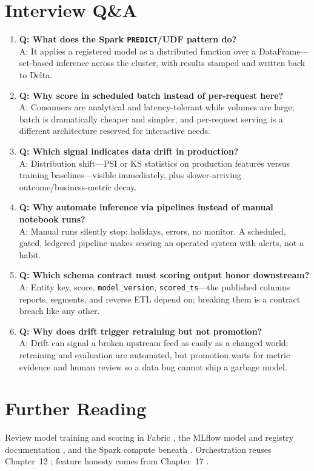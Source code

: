 \section{Interview Q\&A}
\begin{enumerate}
    \item \textbf{Q: What does the Spark \texttt{PREDICT}/UDF pattern do?}\\
    A: It applies a registered model as a distributed function over a DataFrame---set-based inference across the cluster, with results stamped and written back to Delta.
    \item \textbf{Q: Why score in scheduled batch instead of per-request here?}\\
    A: Consumers are analytical and latency-tolerant while volumes are large; batch is dramatically cheaper and simpler, and per-request serving is a different architecture reserved for interactive needs.
    \item \textbf{Q: Which signal indicates data drift in production?}\\
    A: Distribution shift---PSI or KS statistics on production features versus training baselines---visible immediately, plus slower-arriving outcome/business-metric decay.
    \item \textbf{Q: Why automate inference via pipelines instead of manual notebook runs?}\\
    A: Manual runs silently stop: holidays, errors, no monitor. A scheduled, gated, ledgered pipeline makes scoring an operated system with alerts, not a habit.
    \item \textbf{Q: Which schema contract must scoring output honor downstream?}\\
    A: Entity key, score, \texttt{model\_version}, \texttt{scored\_ts}---the published columns reports, segments, and reverse ETL depend on; breaking them is a contract breach like any other.
    \item \textbf{Q: Why does drift trigger retraining but not promotion?}\\
    A: Drift can signal a broken upstream feed as easily as a changed world; retraining and evaluation are automated, but promotion waits for metric evidence and human review so a data bug cannot ship a garbage model.
\end{enumerate}

\section{Further Reading}
Review model training and scoring in Fabric \cite{microsoftFabricMlTraining}, the MLflow model and registry documentation \cite{mlflowDocs,microsoftMlflowFabric}, and the Spark compute beneath \cite{microsoftFabricSparkCompute}. Orchestration reuses Chapter~12 \cite{microsoftFabricPipelines,microsoftFabricMonitoringHub}; feature honesty comes from Chapter~17 \cite{microsoftFabricDataScience}.

